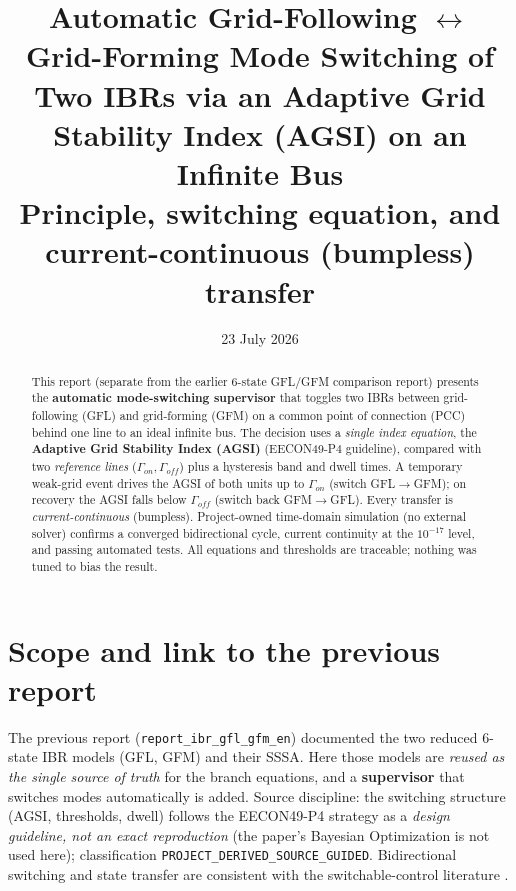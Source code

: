 \documentclass[12pt,a4paper]{article}
\title{\textbf{Automatic Grid-Following $\leftrightarrow$ Grid-Forming Mode Switching of Two IBRs
via an Adaptive Grid Stability Index (AGSI) on an Infinite Bus}\\
\large Principle, switching equation, and current-continuous (bumpless) transfer}
\date{23 July 2026}
\begin{document}
\maketitle

\begin{abstract}
This report (separate from the earlier 6-state GFL/GFM comparison report) presents the
\textbf{automatic mode-switching supervisor} that toggles two IBRs between grid-following (GFL) and
grid-forming (GFM) on a common point of connection (PCC) behind one line to an ideal infinite bus. The
decision uses a \emph{single index equation}, the \textbf{Adaptive Grid Stability Index (AGSI)}
(EECON49-P4 guideline), compared with two \emph{reference lines} ($\Gamma_{on},\Gamma_{off}$) plus a
hysteresis band and dwell times. A temporary weak-grid event drives the AGSI of both units up to
$\Gamma_{on}$ (switch GFL$\to$GFM); on recovery the AGSI falls below $\Gamma_{off}$ (switch back
GFM$\to$GFL). Every transfer is \emph{current-continuous} (bumpless). Project-owned time-domain
simulation (no external solver) confirms a converged bidirectional cycle, current continuity at the
$10^{-17}$ level, and passing automated tests. All equations and thresholds are traceable; nothing was
tuned to bias the result.
\end{abstract}

\section{Scope and link to the previous report}
The previous report (\texttt{report\_ibr\_gfl\_gfm\_en}) documented the two reduced 6-state IBR models
(GFL, GFM) and their SSSA. Here those models are \emph{reused as the single source of truth} for the
branch equations, and a \textbf{supervisor} that switches modes automatically is added. Source
discipline: the switching structure (AGSI, thresholds, dwell) follows the EECON49-P4 strategy
\cite{eecon49en} as a \emph{design guideline, not an exact reproduction} (the paper's Bayesian
Optimization is not used here); classification \texttt{PROJECT\_DERIVED\_SOURCE\_GUIDED}. Bidirectional
switching and state transfer are consistent with the switchable-control literature
\cite{ding2025e,liu2024e,gao2025e}.
\end{document}
